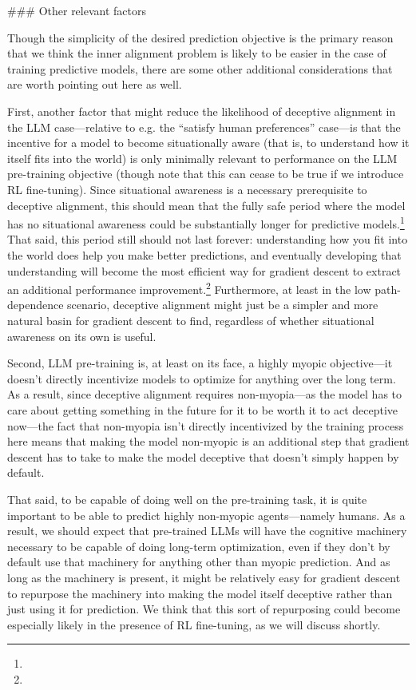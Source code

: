 {### Other relevant factors

Though the simplicity of the desired prediction objective is the primary reason that we think the inner alignment problem is likely to be easier in the case of training predictive models, there are some other additional considerations that are worth pointing out here as well.

First, another factor that might reduce the likelihood of deceptive alignment in the LLM case---relative to e.g. the ``satisfy human preferences'' case---is that the incentive for a model to become situationally aware (that is, to understand how it itself fits into the world) is only minimally relevant to performance on the LLM pre-training objective (though note that this can cease to be true if we introduce RL fine-tuning\cite{TODO: cite TODO}). Since situational awareness is a necessary prerequisite to deceptive alignment, this should mean that the fully safe period where the model has no situational awareness could be substantially longer for predictive models.\footnote{} That said, this period still should not last forever: understanding how you fit into the world does help you make better predictions, and eventually developing that understanding will become the most efficient way for gradient descent to extract an additional performance improvement.\footnote{} Furthermore, at least in the low path-dependence scenario, deceptive alignment might just be a simpler and more natural basin for gradient descent to find, regardless of whether situational awareness on its own is useful.

Second, LLM pre-training is, at least on its face, a highly myopic objective---it doesn't directly incentivize models to optimize for anything over the long term. As a result, since deceptive alignment requires non-myopia---as the model has to care about getting something in the future for it to be worth it to act deceptive now---the fact that non-myopia isn't directly incentivized by the training process here means that making the model non-myopic is an additional step that gradient descent has to take to make the model deceptive that doesn't simply happen by default.

That said, to be capable of doing well on the pre-training task, it is quite important to be able to predict highly non-myopic agents---namely humans. As a result, we should expect that pre-trained LLMs will have the cognitive machinery necessary to be capable of doing long-term optimization, even if they don't by default use that machinery for anything other than myopic prediction. And as long as the machinery is present, it might be relatively easy for gradient descent to repurpose the machinery into making the model itself deceptive rather than just using it for prediction. We think that this sort of repurposing could become especially likely in the presence of RL fine-tuning, as we will discuss shortly\cite{TODO: cite TODO}.

}
